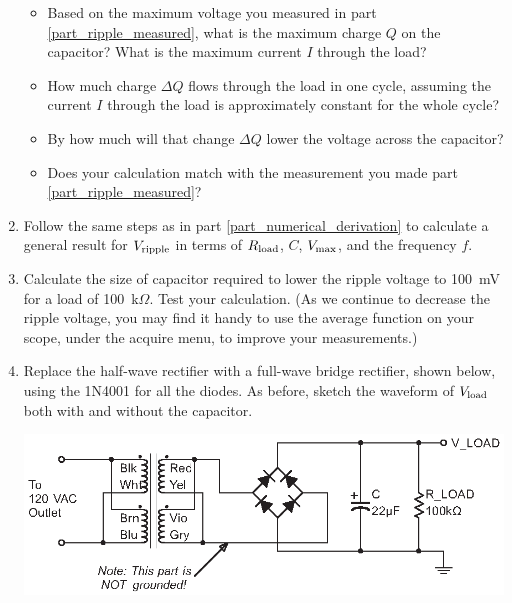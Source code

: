 \begin{enumerate}[wide]
\begin{itemize}
\item Based on the maximum voltage you measured in part \ref{part_ripple_measured}, what is the maximum charge $Q$ on the capacitor?  What is the maximum current $I$ through the load?  \label{part_numerical_derivation}

\item How much charge $\Delta Q$ flows through the load in one cycle, assuming the current $I$ through the load is approximately constant for the whole cycle?  

\item By how much will that change $\Delta Q$ lower the voltage across the capacitor?  

\item Does your calculation match with the measurement you made part \ref{part_ripple_measured}?  
\end{itemize}

\item Follow the same steps as in part \ref{part_numerical_derivation} to calculate a general result for $V_{\rm ripple}$ in terms of $R_{\rm load}$, $C$,  $V_{\rm max}$, and the frequency $f$. \label{part_symbolic_derivation}

\item Calculate the size of capacitor required to lower the ripple voltage to 100~mV for a load of 100~k$\Omega$.  Test your calculation.  (As we continue to decrease the ripple voltage, you may find it handy to use the average function on your scope, under the acquire menu, to improve your measurements.)

\item Replace the half-wave rectifier with a full-wave bridge rectifier, shown below, using the 1N4001 for all the diodes.  As before, sketch the waveform of $V_{\rm load}$ both with and without the capacitor. \label{part_full_wave_bridge_rectifier}
\begin{center}
\includegraphics{power_supply/full_wave_bridge_rectifier.eps}
\end{center}


\end{enumerate}
